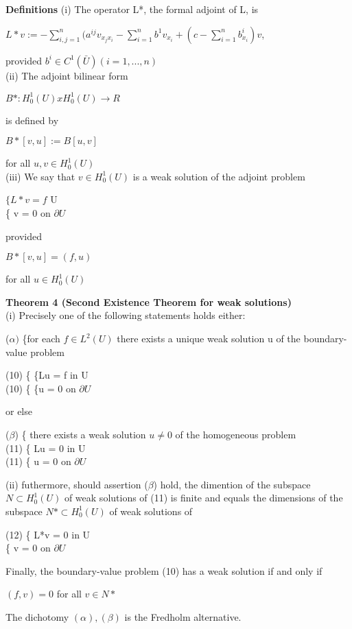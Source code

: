 \documentclass{article}
\newcommand\tab[1][1cm]{\hspace*{#1}}
\begin{document}
\textbf {Definitions} (i) The operator L*, the formal adjoint of L, is 
\begin{center}
$L*v := - \sum_{i,j = 1}^n (a^{ij}v_{x_{j}{x_{i}}} - \sum_{i=1}^n b^1 v_{x_{i}} + (c - \sum_{i=1}^n b^i_{x_{i}})v$,
\end{center}
provided $b^i \in C^1 (\bar{U}) (i=1,...,n)$ \\
\tab (ii) The adjoint bilinear form
\begin{center}
$B* : H_0^1(U) x H_0^1(U) \to R$
\end{center}
is defined by 
\begin{center}
$B*[v,u] := B[u,v]$
\end{center}
for all $u, v \in H_0^1 (U)$ \\
\tab (iii) We say that $v \in H_0^1(U)$ is a weak solution of the adjoint problem
\begin{center}
$\{L*v = f$ \tab U \\
\{ v = 0 \tab on $\partial U$
\end{center}
provided
\begin{center}
$B*[v,u] = (f,u)$
\end{center}
for all $u \in H_0^1(U)$

\textbf {Theorem 4 (Second Existence Theorem for weak solutions)} \\ \tab (i) Precisely one of the following statements holds either:
\begin{center}
($\alpha)$ \tab \{for each $f \in L^2(U)$ there exists a unique weak solution u of the boundary-value problem

(10) \tab \{ \{Lu = f \tab in U \\
(10) \tab \{ \{u = 0 \tab on $\partial U$
\end{center}
\tab or else 
\begin{center}
($\beta$) \tab \{ there exists a weak solution $u \neq 0$ of the homogeneous problem \\
\tab (11) \tab \{ Lu = 0 \tab in U \\
\tab (11) \tab \{ u = 0 \tab on $\partial U$
\end{center}
\tab (ii) futhermore, should assertion ($\beta$) hold, the dimention of the subspace $N \subset H_0^1(U)$ of weak solutions of (11) is finite and equals the dimensions of the subspace $N* \subset H_0^1(U)$ of weak solutions of 
\begin{center}
(12) \tab \{ L*v = 0 \tab in U \\
\tab \{ v = 0 \tab on $\partial U$
\end{center}
Finally, the boundary-value problem (10) has a weak solution if and only if
\begin{center}
$(f,v) = 0$ \tab for all $v \in N*$
\end{center}
The dichotomy $(\alpha), (\beta)$ is the Fredholm alternative.
\end{document}
